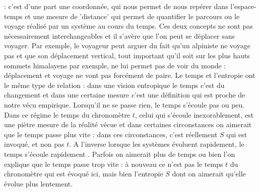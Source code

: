 : c'est d'une part une coordonnée, qui nous permet de nous repérer dans l'espace-temps et une mesure de 'distance' qui permet de quantifier le parcours ou le voyage réalisé par un système au cours du temps. Ces deux concepts ne sont pas nécessairement interchangeables et il s'avère que l'on peut se déplacer sans voyager. Par exemple, le voyageur peut arguer du fait qu'un alpiniste ne voyage pas et que son déplacement vertical, tout important qu'il soit sur les plus hauts sommets himalayens par exemple, ne lui permet pas de voir du monde : déplacement et voyage ne vont pas forcément de paire. Le temps et l'entropie ont le même type de relation : dans une vision entropique le temps c'est du changement et dans une certaine mesure c'est une définition qui est proche de notre vécu empirique. Lorsqu'il ne se passe rien, le temps s'écoule pas ou peu. Dans ce régime le temps du chronomètre $t$, celui qui s'écoule inexorablement, est une piètre mesure de la réalité vécue et dans certaines circonstances on aimerait que le temps passe plus vite : dans ces circonstances, c'est réellement $S$ qui est invoqué, et non pas $t$. A l'inverse lorsque les systèmes évoluent rapidement, le temps s'écoule rapidement . Parfois on aimerait plus de temps ou bien l'on explique que le temps passe trop vite : à nouveau ce n'est pas le temps $t$ du chronomètre qui est évoqué ici, mais bien l'entropie $S$ dont on  aimerait qu'elle évolue plus lentement.

